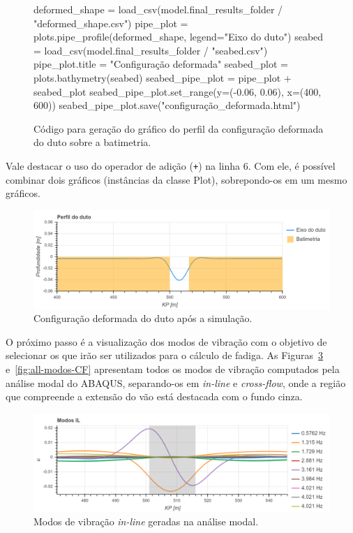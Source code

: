 \begin{figure}[!ht]
\caption{Código para geração do gráfico do perfil da configuração deformada do duto sobre a batimetria.}\label{code:deformada}
\begin{pythoncode}
deformed_shape = load_csv(model.final_results_folder / "deformed_shape.csv")
pipe_plot = plots.pipe_profile(deformed_shape, legend="Eixo do duto")
seabed = load_csv(model.final_results_folder / "seabed.csv")
pipe_plot.title = "Configuração deformada"
seabed_plot = plots.bathymetry(seabed)
seabed_pipe_plot = pipe_plot + seabed_plot
seabed_pipe_plot.set_range(y=(-0.06, 0.06), x=(400, 600))
seabed_pipe_plot.save("configuração_deformada.html")
\end{pythoncode}
\end{figure}

Vale destacar o uso do operador de adição (\texttt{+}) na linha 6. Com ele, é possível combinar dois gráficos (instâncias da classe Plot), sobrepondo-os em um mesmo gráficos.

\begin{figure}[!ht]
	\centering
	\caption{Configuração deformada do duto após a simulação.}\label{fig:ex-config-deformada}
	\includegraphics[width=\textwidth]{imagens/exemplo/deformada}
\end{figure}

O próximo passo é a visualização dos modos de vibração com o objetivo de selecionar os que irão ser utilizados para o cálculo de fadiga. As Figuras~\ref{fig:all-modos-IL} e~\ref{fig:all-modos-CF} apresentam todos os modos de vibração computados pela análise modal do ABAQUS, separando-os em \textit{in-line} e \textit{cross-flow}, onde a região que compreende a extensão do vão está destacada com o fundo cinza.

\begin{figure}[H]
	\centering
	\caption{Modos de vibração \textit{in-line} geradas na análise modal.}\label{fig:all-modos-IL}
	\includegraphics[width=\textwidth]{imagens/exemplo/all_modos_IL}
\end{figure}

